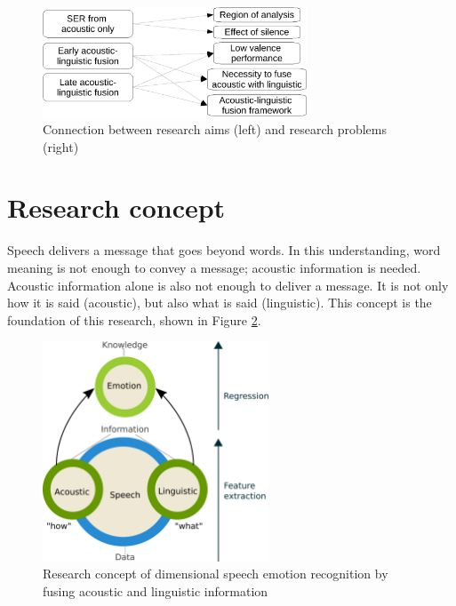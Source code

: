 \begin{figure}[htbp]
    \centering
    \includegraphics[width=0.7\textwidth]{../fig/aims_issues-crop.pdf}
    \caption{Connection between research aims (left) and research problems (right)}
    \label{fig:aims_issues}
\end{figure}

\section{Research concept}
Speech delivers a message that goes beyond words. In this understanding, word
meaning is not enough to convey a message; acoustic information is needed.
Acoustic information alone is also not enough to deliver a message. It is not
only how it is said (acoustic), but also what is said (linguistic).
This concept is the foundation of this research, shown in Figure
\ref{fig:concept}. 

\begin{figure}[htbp]
    \centering
    \includegraphics[width=0.6\textwidth]{../fig/concept-rev.pdf}
    \caption{Research concept of dimensional speech emotion recognition by fusing acoustic and linguistic information}
    \label{fig:concept}
\end{figure}


